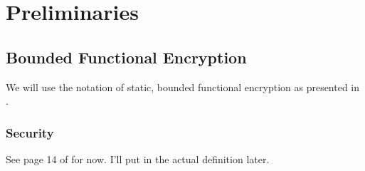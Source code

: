 \section{Preliminaries}
\subsection{Bounded Functional Encryption}
We will use the notation of static, bounded functional encryption as presented in
\cite{garg2022dynamic}.

\subsubsection*{Security}
See page 14 of \cite{garg2022dynamic} for now. I'll put in the actual definition later.